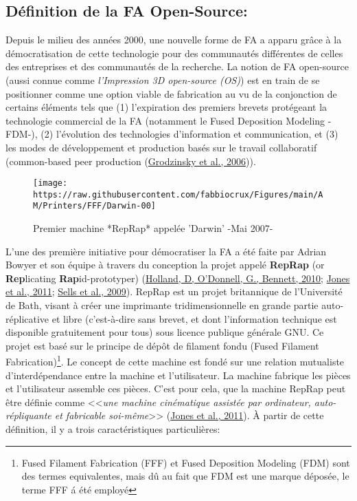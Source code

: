 \documentclass[
]{article}
\begin{document}
\hypertarget{duxe9finition-de-la-fa-open-source}{%
\subsection{Définition de la FA
Open-Source:}\label{duxe9finition-de-la-fa-open-source}}

Depuis le milieu des années 2000, une nouvelle forme de FA a apparu
grâce à la démocratisation de cette technologie pour des communautés
différentes de celles des entreprises et des communautés de la
recherche. La notion de FA open-source (aussi connue comme
\emph{l'Impression 3D open-source (OS)}) est en train de se positionner
comme une option viable de fabrication au vu de la conjonction de
certains éléments tels que (1) l'expiration des premiers brevets
protégeant la technologie commercial de la FA (notamment le Fused
Deposition Modeling -FDM-), (2) l'évolution des technologies
d'information et communication, et (3) les modes de développement et
production basés sur le travail collaboratif (common-based peer
production (\protect\hyperlink{ref-Grodzinsky2006}{Grodzinsky et al.,
2006})).

\begin{figure}

{\centering \texttt{[image: https://raw.githubusercontent.com/fabbiocrux/Figures/main/AM/Printers/FFF/Darwin-00]} 

}

\caption{Premier machine *RepRap* appelée 'Darwin' -Mai 2007-}\label{fig:darwing-reprap}
\end{figure}

L'une des première initiative pour démocratiser la FA a été faite par
Adrian Bowyer et son équipe à travers du conception la projet appelé
\textbf{RepRap} (or \textbf{Rep}licating \textbf{Rap}id-prototyper)
(\protect\hyperlink{ref-Holland2010}{Holland, D, O'Donnell, G., Bennett,
2010}; \protect\hyperlink{ref-Jones2011}{Jones et al., 2011};
\protect\hyperlink{ref-Sells2009a}{Sells et al., 2009}). RepRap est un
projet britannique de l'Université de Bath, visant à créer une
imprimante tridimensionnelle en grande partie auto-réplicative et libre
(c'est-à-dire sans brevet, et dont l'information technique est
disponible gratuitement pour tous) sous licence publique générale GNU.
Ce projet est basé sur le principe de dépôt de filament fondu (Fused
Filament Fabrication)\footnote{Fused Filament Fabrication (FFF) et Fused
  Deposition Modeling (FDM) sont des termes equivalentes, mais dû au
  fait que FDM est une marque déposée, le terme FFF á été employé}. Le
concept de cette machine est fondé sur une relation mutualiste
d'interdépendance entre la machine et l'utilisateur. La machine fabrique
les pièces et l'utilisateur assemble ces pièces. C'est pour cela, que la
machine RepRap peut être définie comme \textless\textless{}\emph{une
machine cinématique assistée par ordinateur, auto-répliquante et
fabricable soi-même}\textgreater\textgreater{}
(\protect\hyperlink{ref-Jones2011}{Jones et al., 2011}). À partir de
cette définition, il y a trois caractéristiques particulières:
\end{document}
